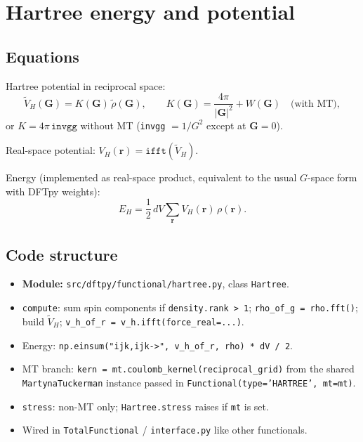 \documentclass[11pt,a4paper]{article}
\begin{document}
\section{Hartree energy and potential}

\subsection{Equations}

Hartree potential in reciprocal space:
\begin{equation}
  \tilde V_H(\mathbf G) = K(\mathbf G)\,\tilde\rho(\mathbf G),
  \qquad
  K(\mathbf G) = \frac{4\pi}{|\mathbf G|^2} + W(\mathbf G)\quad\text{(with MT)},
\end{equation}
or $K = 4\pi\,\texttt{invgg}$ without MT (\texttt{invgg} $= 1/G^2$ except at $\mathbf G=0$).

Real-space potential: $V_H(\mathbf r) = \texttt{ifft}(\tilde V_H)$.

Energy (implemented as real-space product, equivalent to the usual $G$-space form with DFTpy weights):
\begin{equation}
  E_H = \frac{1}{2}\,dV\sum_{\mathbf r} V_H(\mathbf r)\,\rho(\mathbf r).
\end{equation}

\subsection{Code structure}

\begin{itemize}
  \item \textbf{Module:} \texttt{src/dftpy/functional/hartree.py}, class \texttt{Hartree}.
  \item \texttt{compute}: sum spin components if \texttt{density.rank > 1}; \texttt{rho\_of\_g = rho.fft()};
        build $\tilde V_H$; \texttt{v\_h\_of\_r = v\_h.ifft(force\_real=...)}.
  \item Energy: \texttt{np.einsum("ijk,ijk->", v\_h\_of\_r, rho) * dV / 2}.
  \item MT branch: \texttt{kern = mt.coulomb\_kernel(reciprocal\_grid)} from the shared
        \texttt{MartynaTuckerman} instance passed in \texttt{Functional(type='HARTREE', mt=mt)}.
  \item \texttt{stress}: non-MT only; \texttt{Hartree.stress} raises if \texttt{mt} is set.
  \item Wired in \texttt{TotalFunctional} / \texttt{interface.py} like other functionals.
\end{itemize}
\end{document}
